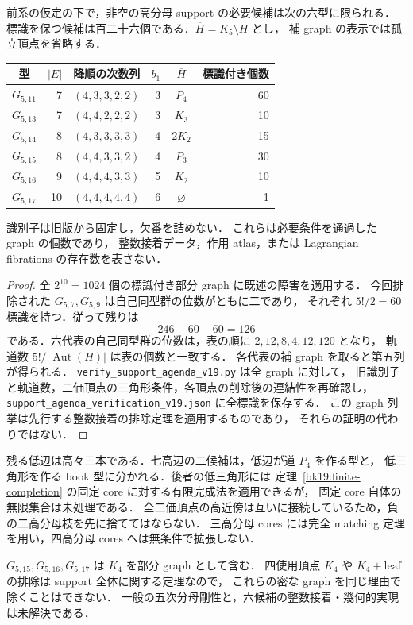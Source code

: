 \begin{corollary}
\label{sf19:remaining-support}
前系の仮定の下で，非空の高分母 support の必要候補は次の六型に限られる．
標識を保つ候補は百二十六個である．$\overline H=K_5\setminus H$ とし，
補 graph の表示では孤立頂点を省略する．
\begin{center}
\small
\begin{tabular}{crcrcr}
型&$|E|$&降順の次数列&$b_1$&$\overline H$&標識付き個数\\\hline
$G_{5,11}$&7&$(4,3,3,2,2)$&3&$P_4$&60\\
$G_{5,13}$&7&$(4,4,2,2,2)$&3&$K_3$&10\\
$G_{5,14}$&8&$(4,3,3,3,3)$&4&$2K_2$&15\\
$G_{5,15}$&8&$(4,4,3,3,2)$&4&$P_3$&30\\
$G_{5,16}$&9&$(4,4,4,3,3)$&5&$K_2$&10\\
$G_{5,17}$&10&$(4,4,4,4,4)$&6&$\varnothing$&1
\end{tabular}
\end{center}
識別子は旧版から固定し，欠番を詰めない．
これらは必要条件を通過した graph の個数であり，
整数接着データ，作用 atlas，または Lagrangian fibrations の存在数を表さない．
\end{corollary}

\begin{proof}
全 $2^{10}=1024$ 個の標識付き部分 graph に既述の障害を適用する．
今回排除された $G_{5,7},G_{5,9}$ は自己同型群の位数がともに二であり，
それぞれ $5!/2=60$ 標識を持つ．従って残りは
\[
 246-60-60=126
\]
である．六代表の自己同型群の位数は，表の順に $2,12,8,4,12,120$ となり，
軌道数 $5!/|\operatorname{Aut}(H)|$ は表の個数と一致する．
各代表の補 graph を取ると第五列が得られる．
\nolinkurl{verify_support_agenda_v19.py} は全 graph に対して，
旧識別子と軌道数，二価頂点の三角形条件，各頂点の削除後の連結性を再確認し，
\nolinkurl{support_agenda_verification_v19.json} に全標識を保存する．
この graph 列挙は先行する整数接着の排除定理を適用するものであり，
それらの証明の代わりではない．
\end{proof}

残る低辺は高々三本である．七高辺の二候補は，低辺が道 $P_4$ を作る型と，
低三角形を作る book 型に分かれる．後者の低三角形には
定理~\ref{bk19:finite-completion} の固定 core に対する有限完成法を適用できるが，
固定 core 自体の無限集合は未処理である．
全二価頂点の高近傍は互いに接続しているため，負の二高分母枝を先に捨ててはならない．
三高分母 cores には完全 matching 定理を用い，四高分母 cores へは無条件で拡張しない．

$G_{5,15},G_{5,16},G_{5,17}$ は $K_4$ を部分 graph として含む．
四使用頂点 $K_4$ や $K_4+\mathrm{leaf}$ の排除は support 全体に関する定理なので，
これらの密な graph を同じ理由で除くことはできない．
一般の五次分母剛性と，六候補の整数接着・幾何的実現は未解決である．
